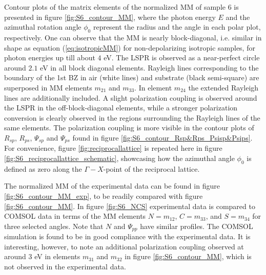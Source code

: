 Contour plots of the matrix elements of the normalized MM of sample 6 is presented in figure \ref{fig:S6_contour_MM}, where the photon energy $E$ and the azimuthal rotation angle $\phi_0$ represent the radius and the angle in each polar plot, respectively. One can observe that the MM is nearly block-diagonal, i.e. similar in shape as equation (\ref{eq:isotropicMM}) for non-depolarizing isotropic samples, for photon energies up till about $4$ eV. The LSPR is observed as a near-perfect circle around $2.1$ eV in all block diagonal elements. Rayleigh lines corresponding to the boundary of the 1st BZ in air (white lines) and substrate (black semi-square) are superposed in MM elements $m_{21}$ and $m_{33}$. In element $m_{24}$ the extended Rayleigh lines are additionally included. A slight polarization coupling is observed around the LSPR in the off-block-diagonal elements, while a stronger polarization conversion is clearly observed in the regions surrounding the Rayleigh lines of the same elements. The polarization coupling is more visible in the contour plots of $R_{sp}$, $R_{ps}$, $\Psi_{sp}$ and $\Psi_{ps}$ found in figure \ref{fig:S6_contour_Rsp&Rps_Psisp&Psips}. For convenience, figure \ref{fig:reciprocallattice} is repeated here in figure \ref{fig:S6_reciprocallattice_schematic}, showcasing how the azimuthal angle $\phi_0$ is defined as zero along the $\Gamma-X$-point of the reciprocal lattice.

The normalized MM of the experimental data can be found in figure \ref{fig:S6_contour_MM_exp}, to be readily compared with figure \ref{fig:S6_contour_MM}. In figure \ref{fig:S6_NCS} experimental data is compared to COMSOL data in terms of the MM elements $N=m_{12}$, $C=m_{33}$, and $S=m_{34}$ for three selected angles. Note that $N$ and $\Psi_{pp}$ have similar profiles. The COMSOL simulation is found to be in good compliance with the experimental data. It is interesting, however, to note an additional polarization coupling observed at around $3$ eV in elements $m_{31}$ and $m_{32}$ in figure \ref{fig:S6_contour_MM}, which is not observed in the experimental data.

